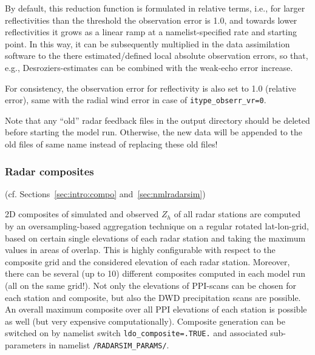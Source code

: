 \documentclass[10pt,a4paper,twoside,headinclude,footinclude,parskip=half]{scrartcl}
\newcommand{\srcform}[1]{\mbox{\texttt{#1}}\xspace}%
\newcommand{\paramform}[1]{\mbox{\texttt{#1}}\xspace}%
\begin{document}
  By default, this reduction function is formulated in relative terms, i.e., for larger reflectivities than the threshold the observation error is 1.0, and towards
  lower reflectivities it grows as a linear ramp at a namelist-specified rate and starting point. In this way, it can be subsequently multiplied in
  the data assimilation software to the there estimated/defined local absolute observation errors, so that, e.g., Desroziers-estimates
  can be combined with the weak-echo error increase.

  For consistency, the observation error for reflectivity is also set to 1.0 (relative error), same with the radial wind error
  in case of \paramform{itype_obserr_vr=0}.
  
  Note that any ``old'' radar feedback files in the output directory should
  be deleted before starting the model run. Otherwise, the new data will be appended to the old files
  of same name instead of replacing these old files!

\subsubsection{Radar composites}

  (cf. Sections~\ref{sec:intro:compo} and~\ref{sec:nmlradarsim})

  2D composites of simulated and observed $Z_h$ of all radar stations are computed
  by an oversampling-based aggregation technique on a regular rotated lat-lon-grid, 
  based on certain single elevations of each radar station and taking the maximum values in
  areas of overlap. This is highly configurable with respect to the composite grid and the considered elevation of each radar station.
  Moreover, there can be several (up to 10) different composites computed in each model run (all on the same grid!).
  Not only the elevations of PPI-scans can be chosen for each station and composite, but also the DWD precipitation scans are possible.
  An overall maximum composite over all PPI elevations of each station is possible as well (but very expensive computationally).
  Composite generation can be switched on by namelist switch \srcform{ldo_composite=.TRUE.} and associated sub-parameters in namelist
  \srcform{/RADARSIM_PARAMS/}.
\end{document}
